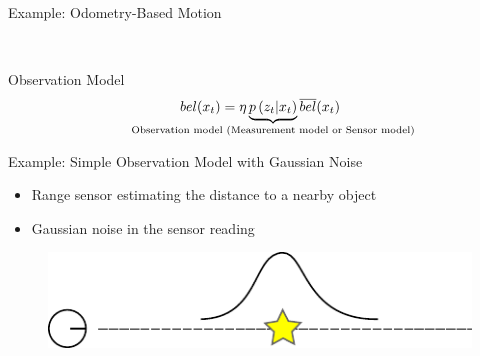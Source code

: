 \begin{frame}{Example: Odometry-Based Motion}
    
    \begin{figure}[!h]
    \centering
    \\
    \end{figure}
    
    \end{frame}
    
    \begin{frame}{Observation Model}
    \begin{equation*}
    bel(\state_{t}) = \eta \underbrace{p\left(\observation_{t} |\state_{t} \right)}_{\text{\makebox[0pt]{Observation model (Measurement model or Sensor model)}}} \overline{bel}(\state_{t})
    \end{equation*}
    \end{frame}
    
    \begin{frame}{Example: Simple Observation Model with Gaussian Noise}
    
    \begin{itemize}
    \item Range sensor estimating the distance to a nearby object
    \item Gaussian noise in the sensor reading
    \end{itemize} 
    
    \begin{figure}[!h]
        \includegraphics[width=0.6\columnwidth]{./images/simple_observation_model.pdf}
        \end{figure}
    
\end{frame}